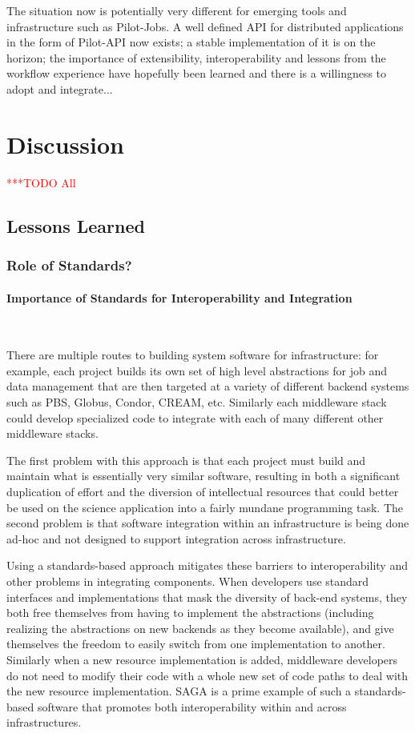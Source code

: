 \documentclass[a4paper,12pt]{article}
\newcommand{\todo}[1]{     {\textcolor{red}  { ***TODO      #1 }}}
\newcommand{\todo}[1]{}
\begin{document}
The situation now is potentially very different for emerging tools and
infrastructure such as Pilot-Jobs. A well defined API for distributed
applications in the form of Pilot-API now exists; a stable
implementation of it is on the horizon; the importance of
extensibility, interoperability and lessons from the workflow
experience have hopefully been learned and there is a willingness to
adopt and integrate...

% 
\section{Discussion}\todo{All}

\subsection{Lessons Learned}

\subsubsection{Role of Standards?}

\paragraph{Importance of Standards for Interoperability and
    Integration}~

There are multiple routes to building system software for
infrastructure: for example, each project builds its own set of high
level abstractions for job and data management that are then targeted
at a variety of different backend systems such as PBS, Globus, Condor,
CREAM, etc. Similarly each middleware stack could develop specialized
code to integrate with each of many different other middleware stacks.

The first problem with this approach is that each project must build
and maintain what is essentially very similar software, resulting in
both a significant duplication of effort and the diversion of
intellectual resources that could better be used on the science
application into a fairly mundane programming task.  The second
problem is that software integration within an infrastructure is being
done ad-hoc and not designed to support integration across
infrastructure.

Using a standards-based approach mitigates these barriers to
interoperability and other problems in integrating components. When
developers use standard interfaces and implementations that mask the
diversity of back-end systems, they both free themselves from having
to implement the abstractions (including realizing the abstractions on
new backends as they become available), and give themselves the
freedom to easily switch from one implementation to another. Similarly
when a new resource implementation is added, middleware developers do
not need to modify their code with a whole new set of code paths to
deal with the new resource implementation.  SAGA is a prime example of
such a standards-based software that promotes both interoperability
within and across infrastructures.
\end{document}
